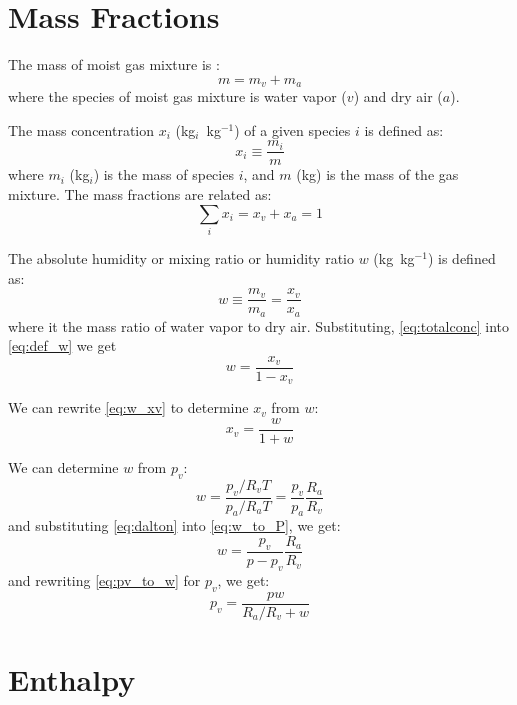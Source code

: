 \section*{Mass Fractions}

The mass of moist gas mixture is :
\begin{equation}
m = m_v + m_a
\end{equation}
where the species of moist gas mixture is water vapor ($v$) and dry air ($a$).

The mass concentration $x_i$ (kg$_i$~kg$^{-1}$) of a given species $i$ is defined as:
\begin{equation}
x_i \equiv \frac{m_i}{m}
\end{equation}
where $m_i$ (kg$_i$) is the mass of species $i$, and $m$ (kg) is the mass of the gas mixture. The mass fractions are related as:
\begin{equation}
\sum_i x_i = x_v + x_a = 1
\label{eq:totalconc}
\end{equation}

The absolute humidity or mixing ratio or humidity ratio $w$ (kg~kg$^{-1}$) is defined as:
\begin{equation}
w \equiv \frac{m_v}{m_a} = \frac{x_v}{x_a}
\label{eq:def_w}
\end{equation}
where it the mass ratio of water vapor to dry air. Substituting, \ref{eq:totalconc} into \ref{eq:def_w} we get
\begin{equation}
w = \frac{x_v}{1 - x_v}
\label{eq:w_xv}
\end{equation}

We can rewrite \ref{eq:w_xv} to determine $x_v$ from $w$:
\begin{equation}
x_v = \frac{w}{1 + w}
\label{eq:xv_w}
\end{equation}

We can determine $w$ from $p_v$:
\begin{equation}
w = \frac{p_v/R_v T}{p_a/ R_aT} = \frac{p_v}{p_a}\frac{R_a}{R_v}
\label{eq:w_to_P}
\end{equation}
and substituting \ref{eq:dalton} into \ref{eq:w_to_P}, we get:
\begin{equation}
w = \frac{p_v}{p-p_v}\frac{R_a}{R_v}
\label{eq:pv_to_w}
\end{equation}
and rewriting \ref{eq:pv_to_w} for $p_v$, we get:
\begin{equation}
p_v = \frac{p w}{R_a/R_v+w}
\label{eq:w_to_pv}
\end{equation}

\section*{Enthalpy}

